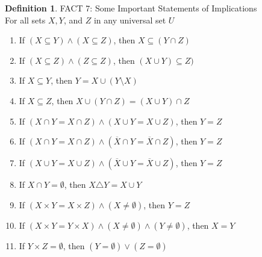 \documentclass{book}
\theoremstyle{definition}
\newtheorem{definition}{Definition}[section]
\theoremstyle{remark}
\begin{document}
\begin{definition}
FACT 7: Some Important Statements of Implications \\

For all sets $X, Y$, and $Z$ in any universal set $U$ \\

    \begin{enumerate}
        \item If $(X \subseteq Y) \wedge (X \subseteq Z)$, then $X \subseteq (Y \cap Z)$
        \item If $(X \subseteq Z) \wedge (Z \subseteq Z)$, then $(X \cup Y) \subseteq Z)$
        \item If $X \subseteq Y$, then $Y = X \cup (Y \setminus X)$
        \item If $X \subseteq Z$, then $X \cup (Y \cap Z) = (X \cup Y) \cap Z$
        \item If $(X \cap Y = X \cap Z) \wedge (X \cup Y = X \cup Z)$, then $Y = Z$
        \item If $(X \cap Y = X \cap Z) \wedge (\overline{X} \cap Y = \overline{X} \cap Z)$, then $Y = Z$
        \item If $(X \cup Y = X \cup Z) \wedge (\overline{X} \cup Y = \overline{X} \cup Z)$, then $Y = Z$
        \item If $X \cap Y = \emptyset$, then $X \triangle Y = X \cup Y$
        \item If $(X \times Y = X \times Z) \wedge (X \neq \emptyset)$, then $Y = Z$
        \item If $(X \times Y = Y \times X) \wedge (X \neq \emptyset) \wedge (Y \neq \emptyset)$, then $X = Y$
        \item If $Y \times Z = \emptyset$, then $(Y = \emptyset) \vee (Z = \emptyset)$
    \end{enumerate}
\end{definition}
\end{document}
